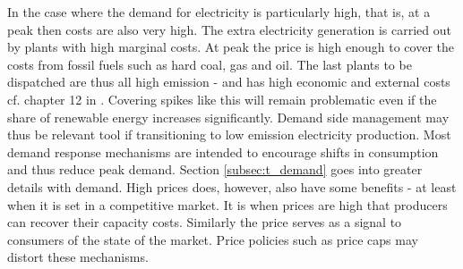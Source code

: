 In the case where the demand for electricity is particularly high, that is, at a peak then costs are also very high. The extra electricity generation is carried out by plants with high marginal costs. At peak the price is high enough to cover the costs from fossil fuels such as hard coal, gas and oil. The last plants to be dispatched are thus all high emission - and has high economic and external costs cf. chapter 12 in \citet{zweifel2017energy}. Covering spikes like this will remain problematic even if the share of renewable energy increases significantly. Demand side management may thus be relevant tool if transitioning to low emission electricity production. Most demand response mechanisms are intended to encourage shifts in consumption and thus reduce peak demand. Section \ref{subsec:t_demand} goes into greater details with demand. High prices does, however, also have some benefits - at least when it is set in a competitive market. It is when prices are high that producers can recover their capacity costs. Similarly the price serves as a signal to consumers of the state of the market. Price policies such as price caps may distort these mechanisms.



